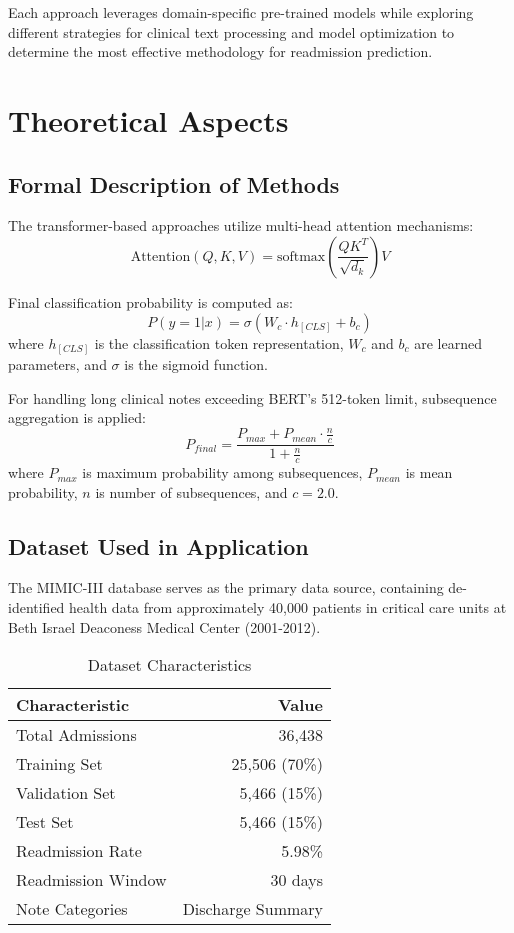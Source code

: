 \documentclass[11pt,a4paper]{article}
\begin{document}
Each approach leverages domain-specific pre-trained models while exploring different strategies for clinical text processing and model optimization to determine the most effective methodology for readmission prediction.

\section{Theoretical Aspects}

\subsection{Formal Description of Methods}

The transformer-based approaches utilize multi-head attention mechanisms:
\begin{equation}
\text{Attention}(Q, K, V) = \text{softmax}\left(\frac{QK^T}{\sqrt{d_k}}\right)V
\end{equation}

Final classification probability is computed as:
\begin{equation}
P(y=1|x) = \sigma(W_c \cdot h_{[CLS]} + b_c)
\end{equation}
where $h_{[CLS]}$ is the classification token representation, $W_c$ and $b_c$ are learned parameters, and $\sigma$ is the sigmoid function.

For handling long clinical notes exceeding BERT's 512-token limit, subsequence aggregation is applied:
\begin{equation}
P_{final} = \frac{P_{max} + P_{mean} \cdot \frac{n}{c}}{1 + \frac{n}{c}}
\end{equation}
where $P_{max}$ is maximum probability among subsequences, $P_{mean}$ is mean probability, $n$ is number of subsequences, and $c = 2.0$.

\subsection{Dataset Used in Application}

The MIMIC-III database serves as the primary data source, containing de-identified health data from approximately 40,000 patients in critical care units at Beth Israel Deaconess Medical Center (2001-2012).

\begin{table}[H]
\centering
\caption{Dataset Characteristics}
\begin{tabular}{@{}lr@{}}
\toprule
\textbf{Characteristic} & \textbf{Value} \\
\midrule
Total Admissions & 36,438 \\
Training Set & 25,506 (70\%) \\
Validation Set & 5,466 (15\%) \\
Test Set & 5,466 (15\%) \\
Readmission Rate & 5.98\% \\
Readmission Window & 30 days \\
Note Categories & Discharge Summary \\
\bottomrule
\end{tabular}
\end{table}
\end{document}
